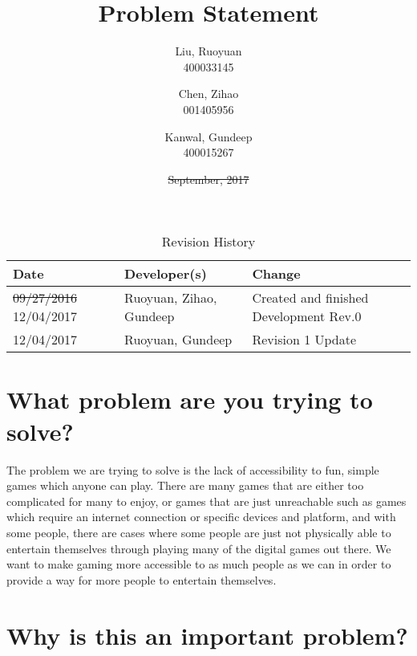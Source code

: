 \documentclass{article}
\title{Problem Statement
}
\author{Liu, Ruoyuan\\
		400033145
		\and
		Chen, Zihao\\
		001405956
		\and
		Kanwal, Gundeep\\
		400015267}
\date{\sout{September, 2017}\rev{December 6, 2017}}
\newcommand{\rev}[1]{\textcolor{RevisionColour}{#1}}
\begin{document}
\maketitle

\newpage
\begin{table}[hp]
	\caption{Revision History} \label{TblRevisionHistory}
	\begin{tabularx}{\textwidth}{llX}
		\toprule
		\textbf{Date} & \textbf{Developer(s)} & \textbf{Change}\\
		\midrule
		\sout{09/27/2016} \rev{12/04/2017} & Ruoyuan, Zihao, Gundeep & Created and finished Development Rev.0\\
		\rev{12/04/2017} & \rev{Ruoyuan, Gundeep} & \rev{Revision 1 Update}\\
		\bottomrule
	\end{tabularx}
\end{table}




\section{What problem are you trying to solve?}

\newcommand*\apos{\textsc{\char13}}
The problem we are trying to solve is the lack of accessibility to fun, simple games which anyone can play. There are many games that are either too complicated for many to enjoy, or games that are just unreachable such as games which require an internet connection \rev{or specific devices and platform}, and with some people, there are cases where some people are just not physically able to entertain themselves through playing many of the digital games out there. We want to make gaming more accessible to as much people as we can in order to provide a way for more people to entertain themselves.

\section{Why is this an important problem?}
\end{document}
